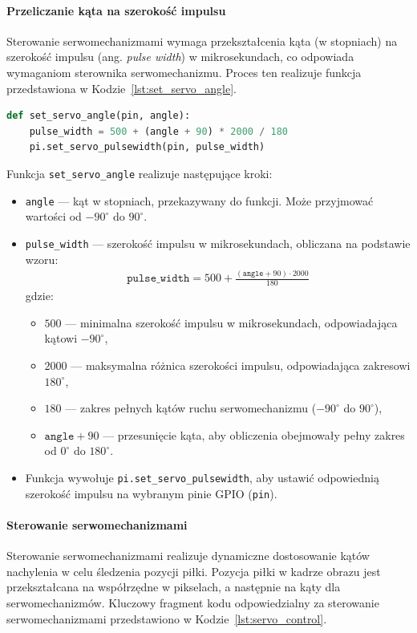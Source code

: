 \documentclass[a4paper,twoside,12pt]{book}
\begin{document}
\paragraph{Przeliczanie kąta na szerokość impulsu}
Sterowanie serwomechanizmami wymaga przekształcenia kąta (w stopniach) na szerokość impulsu (ang. \textit{pulse width}) w mikrosekundach, co odpowiada wymaganiom sterownika serwomechanizmu. Proces ten realizuje funkcja przedstawiona w Kodzie~\ref{lst:set_servo_angle}.

\begin{lstlisting}[language=Python, caption={Przeliczanie kąta na szerokość impulsu.}, label={lst:set_servo_angle}, captionpos=b]
def set_servo_angle(pin, angle):
    pulse_width = 500 + (angle + 90) * 2000 / 180
    pi.set_servo_pulsewidth(pin, pulse_width)
\end{lstlisting}

\newpage
Funkcja \texttt{set\_servo\_angle} realizuje następujące kroki:
\begin{itemize}
    \item \texttt{angle} — kąt w stopniach, przekazywany do funkcji. Może przyjmować wartości od $-90^{\circ}$ do $90^{\circ}$.
    \item \texttt{pulse\_width} — szerokość impulsu w mikrosekundach, obliczana na podstawie wzoru:
    \begin{align}
    \texttt{pulse\_width} = 500 + \frac{(\texttt{angle} + 90) \cdot 2000}{180}
    \end{align}
    gdzie:
    \begin{itemize}
        \item $500$ — minimalna szerokość impulsu w mikrosekundach, odpowiadająca kątowi $-90^{\circ}$,
        \item $2000$ — maksymalna różnica szerokości impulsu, odpowiadająca zakresowi $180^{\circ}$,
        \item $180$ — zakres pełnych kątów ruchu serwomechanizmu ($-90^{\circ}$ do $90^{\circ}$),
        \item $\texttt{angle} + 90$ — przesunięcie kąta, aby obliczenia obejmowały pełny zakres od $0^{\circ}$ do $180^{\circ}$.
    \end{itemize}
    \item Funkcja wywołuje \texttt{pi.set\_servo\_pulsewidth}, aby ustawić odpowiednią szerokość impulsu na wybranym pinie GPIO (\texttt{pin}).
\end{itemize}

\paragraph{Sterowanie serwomechanizmami}
Sterowanie serwomechanizmami realizuje dynamiczne dostosowanie kątów nachylenia w celu śledzenia pozycji piłki. Pozycja piłki w kadrze obrazu jest przekształcana na współrzędne w pikselach, a następnie na kąty dla serwomechanizmów. Kluczowy fragment kodu odpowiedzialny za sterowanie serwomechanizmami przedstawiono w Kodzie~\ref{lst:servo_control}.
\end{document}
